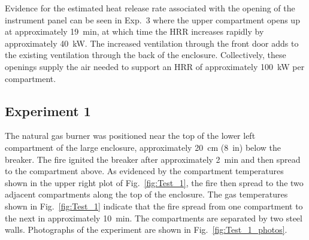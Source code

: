 \documentclass[12pt]{article}
\begin{document}
Evidence for the estimated heat release rate associated with the opening of the instrument panel can be seen in Exp.~3 where the upper compartment opens up at approximately 19~min, at which time the HRR increases rapidly by approximately 40~kW. The increased ventilation through the front door adds to the existing ventilation through the back of the enclosure. Collectively, these openings supply the air needed to support an HRR of approximately 100~kW per compartment.



\clearpage

\subsection{Experiment 1}

The natural gas burner was positioned near the top of the lower left compartment of the large enclosure, approximately 20~cm (8~in) below the breaker. The fire ignited the breaker after approximately 2~min and then spread to the compartment above. As evidenced by the compartment temperatures shown in the upper right plot of Fig.~\ref{fig:Test_1}, the fire then spread to the two adjacent compartments along the top of the enclosure. The gas temperatures shown in Fig.~\ref{fig:Test_1} indicate that the fire spread from one compartment to the next in approximately 10~min. The compartments are separated by two steel walls. Photographs of the experiment are shown in Fig.~\ref{fig:Test_1_photos}.
\end{document}
